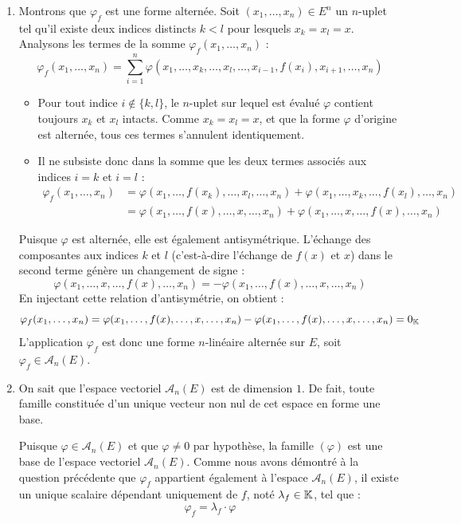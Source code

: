\documentclass[12pt, a4paper]{report}
\begin{document}
\begin{enumerate}
    \item Montrons que $\varphi_f$ est une forme alternée. Soit $(x_1, \dots, x_n) \in E^n$ un $n$-uplet tel qu'il existe deux indices distincts $k < l$ pour lesquels $x_k = x_l = x$. Analysons les termes de la somme $\varphi_f(x_1, \dots, x_n)$ :
    $$\varphi_f(x_1, \dots, x_n) = \sum_{i=1}^n \varphi(x_1, \dots, x_k, \dots, x_l, \dots, x_{i-1}, f(x_i), x_{i+1}, \dots, x_n)$$
    \begin{itemize}
        \item Pour tout indice $i \notin \{k, l\}$, le $n$-uplet sur lequel est évalué $\varphi$ contient toujours $x_k$ et $x_l$ intacts. Comme $x_k = x_l = x$, et que la forme $\varphi$ d'origine est alternée, tous ces termes s'annulent identiquement.
        \item Il ne subsiste donc dans la somme que les deux termes associés aux indices $i = k$ et $i = l$ :
        \begin{align*}
            \varphi_f(x_1, \dots, x_n) &= \varphi(x_1, \dots, f(x_k), \dots, x_l, \dots, x_n) + \varphi(x_1, \dots, x_k, \dots, f(x_l), \dots, x_n) \\
            &= \varphi(x_1, \dots, f(x), \dots, x, \dots, x_n) + \varphi(x_1, \dots, x, \dots, f(x), \dots, x_n)
        \end{align*}
    \end{itemize}
    Puisque $\varphi$ est alternée, elle est également antisymétrique. L'échange des composantes aux indices $k$ et $l$ (c'est-à-dire l'échange de $f(x)$ et $x$) dans le second terme génère un changement de signe :
    $$\varphi(x_1, \dots, x, \dots, f(x), \dots, x_n) = - \varphi(x_1, \dots, f(x), \dots, x, \dots, x_n)$$
    En injectant cette relation d'antisymétrie, on obtient :
    $$\varphi_f(x_1, \dots, x_n) = \varphi(x_1, \dots, f(x), \dots, x, \dots, x_n) - \varphi(x_1, \dots, f(x), \dots, x, \dots, x_n) = 0_{\mathbb{K}}$$
    L'application $\varphi_f$ est donc une forme $n$-linéaire alternée sur $E$, soit $\varphi_f \in \mathscr{A}_n(E)$.

    \item On sait que l'espace vectoriel $\mathscr{A}_n(E)$ est de dimension $1$. De fait, toute famille constituée d'un unique vecteur non nul de cet espace en forme une base. 
    
    Puisque $\varphi \in \mathscr{A}_n(E)$ et que $\varphi \neq 0$ par hypothèse, la famille $(\varphi)$ est une base de l'espace vectoriel $\mathscr{A}_n(E)$.
    Comme nous avons démontré à la question précédente que $\varphi_f$ appartient également à l'espace $\mathscr{A}_n(E)$, il existe un unique scalaire dépendant uniquement de $f$, noté $\lambda_f \in \mathbb{K}$, tel que :
    $$\varphi_f = \lambda_f \cdot \varphi$$
\end{enumerate}
\end{document}
